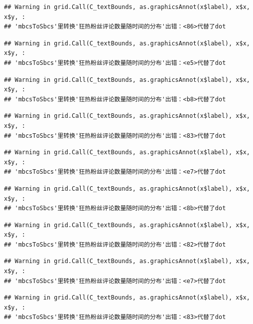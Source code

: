 \documentclass[
]{article}
\begin{document}
\begin{verbatim}
## Warning in grid.Call(C_textBounds, as.graphicsAnnot(x$label), x$x, x$y, :
## 'mbcsToSbcs'里转换'狂热粉丝评论数量随时间的分布'出错：<86>代替了dot
\end{verbatim}

\begin{verbatim}
## Warning in grid.Call(C_textBounds, as.graphicsAnnot(x$label), x$x, x$y, :
## 'mbcsToSbcs'里转换'狂热粉丝评论数量随时间的分布'出错：<e5>代替了dot
\end{verbatim}

\begin{verbatim}
## Warning in grid.Call(C_textBounds, as.graphicsAnnot(x$label), x$x, x$y, :
## 'mbcsToSbcs'里转换'狂热粉丝评论数量随时间的分布'出错：<b8>代替了dot
\end{verbatim}

\begin{verbatim}
## Warning in grid.Call(C_textBounds, as.graphicsAnnot(x$label), x$x, x$y, :
## 'mbcsToSbcs'里转换'狂热粉丝评论数量随时间的分布'出错：<83>代替了dot
\end{verbatim}

\begin{verbatim}
## Warning in grid.Call(C_textBounds, as.graphicsAnnot(x$label), x$x, x$y, :
## 'mbcsToSbcs'里转换'狂热粉丝评论数量随时间的分布'出错：<e7>代替了dot
\end{verbatim}

\begin{verbatim}
## Warning in grid.Call(C_textBounds, as.graphicsAnnot(x$label), x$x, x$y, :
## 'mbcsToSbcs'里转换'狂热粉丝评论数量随时间的分布'出错：<8b>代替了dot
\end{verbatim}

\begin{verbatim}
## Warning in grid.Call(C_textBounds, as.graphicsAnnot(x$label), x$x, x$y, :
## 'mbcsToSbcs'里转换'狂热粉丝评论数量随时间的分布'出错：<82>代替了dot
\end{verbatim}

\begin{verbatim}
## Warning in grid.Call(C_textBounds, as.graphicsAnnot(x$label), x$x, x$y, :
## 'mbcsToSbcs'里转换'狂热粉丝评论数量随时间的分布'出错：<e7>代替了dot
\end{verbatim}

\begin{verbatim}
## Warning in grid.Call(C_textBounds, as.graphicsAnnot(x$label), x$x, x$y, :
## 'mbcsToSbcs'里转换'狂热粉丝评论数量随时间的分布'出错：<83>代替了dot
\end{verbatim}
\end{document}

